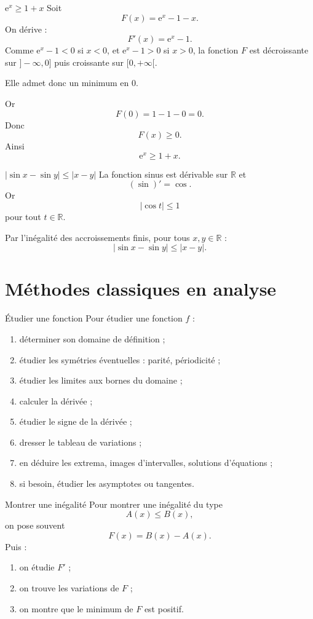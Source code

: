 \documentclass[11pt,a4paper]{article}
\newcommand{\R}{\mathbb{R}}
\newcommand{\e}{\mathrm{e}}
\begin{document}
\begin{proofbox}{$\e^x\geq 1+x$}
Soit
\[
F(x)=\e^x-1-x.
\]
On dérive :
\[
F'(x)=\e^x-1.
\]
Comme $\e^x-1<0$ si $x<0$, et $\e^x-1>0$ si $x>0$, la fonction $F$ est décroissante sur $]-\infty,0]$ puis croissante sur $[0,+\infty[$.

Elle admet donc un minimum en $0$.

Or
\[
F(0)=1-1-0=0.
\]
Donc
\[
F(x)\geq0.
\]
Ainsi
\[
\e^x\geq1+x.
\]
\end{proofbox}

\begin{proofbox}{$|\sin x-\sin y|\leq |x-y|$}
La fonction sinus est dérivable sur $\R$ et
\[
(\sin)'=\cos.
\]
Or
\[
|\cos t|\leq1
\]
pour tout $t\in\R$.

Par l'inégalité des accroissements finis, pour tous $x,y\in\R$ :
\[
|\sin x-\sin y|\leq |x-y|.
\]
\end{proofbox}

\section{Méthodes classiques en analyse}

\begin{methodbox}{Étudier une fonction}
Pour étudier une fonction $f$ :
\begin{enumerate}[label=\arabic*)]
    \item déterminer son domaine de définition ;
    \item étudier les symétries éventuelles : parité, périodicité ;
    \item étudier les limites aux bornes du domaine ;
    \item calculer la dérivée ;
    \item étudier le signe de la dérivée ;
    \item dresser le tableau de variations ;
    \item en déduire les extrema, images d'intervalles, solutions d'équations ;
    \item si besoin, étudier les asymptotes ou tangentes.
\end{enumerate}
\end{methodbox}

\begin{methodbox}{Montrer une inégalité}
Pour montrer une inégalité du type
\[
A(x)\leq B(x),
\]
on pose souvent
\[
F(x)=B(x)-A(x).
\]
Puis :
\begin{enumerate}[label=\arabic*)]
    \item on étudie $F'$ ;
    \item on trouve les variations de $F$ ;
    \item on montre que le minimum de $F$ est positif.
\end{enumerate}
\end{methodbox}
\end{document}
